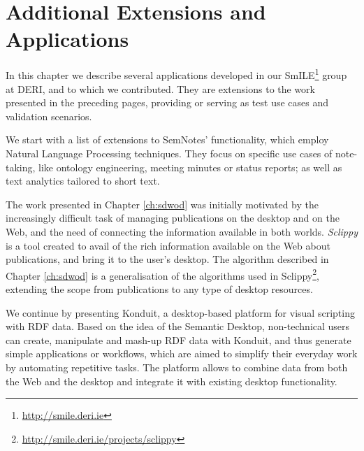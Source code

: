 \chapter{Additional Extensions and Applications}
\label{ch:mischelperapps}

In this chapter we describe several applications developed in our SmILE\footnote{\url{http://smile.deri.ie}} group at DERI, and to which we contributed. They are extensions to the work presented in the preceding pages, providing or serving as test use cases and validation scenarios.

We start with a list of extensions to SemNotes' functionality, which employ Natural Language Processing techniques. They focus on specific use cases of note-taking, like ontology engineering, meeting minutes or status reports; as well as text analytics tailored to short text.

The work presented in Chapter \ref{ch:sdwod} was initially motivated by the increasingly difficult task of managing publications on the desktop and on the Web, and the need of connecting the information available in both worlds. \emph{Sclippy} is a tool created to avail of the rich information available on the Web about publications, and bring it to the user's desktop. 
The algorithm described in Chapter \ref{ch:sdwod} is a generalisation of the algorithms used in Sclippy\footnote{\url{http://smile.deri.ie/projects/sclippy}}, extending the scope from publications to any type of desktop resources.

We continue by presenting Konduit, a desktop-based platform for visual scripting with RDF data. Based on the idea of the Semantic Desktop, non-technical users can create, manipulate and mash-up RDF data with Konduit, and thus generate simple applications or workflows, which are aimed to simplify their everyday work by automating repetitive tasks. The platform allows to combine data from both the Web and the desktop and integrate it with existing desktop functionality.







